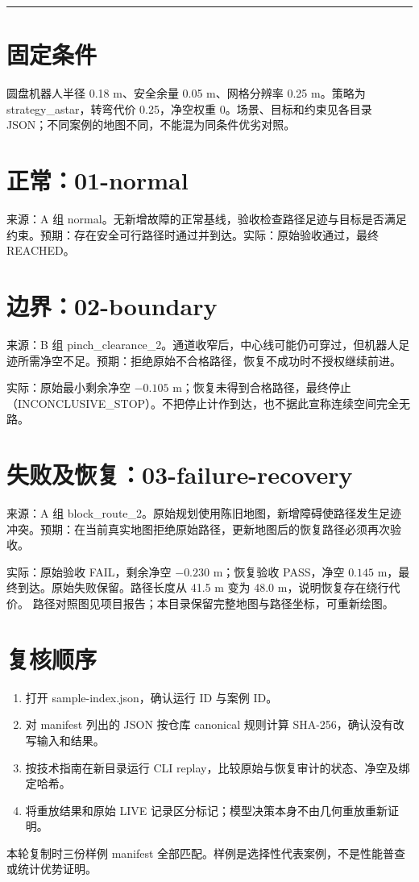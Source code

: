 \documentclass[UTF8,10pt,a4paper]{ctexart}
\newcommand{\cover}[2]{\vspace*{5mm}{\small\textcolor{teal}{WORLDGUARD / SUBMISSION 2026}}\par\vspace{4mm}{\huge\bfseries\color{ink}#1}\par\vspace{3mm}{\large #2}\par\vspace{4mm}\hrule\vspace{5mm}}
\begin{document}
\cover{正常、边界与失败测试样例}{已保存真实执行输入与结果，可离线复核}
\section{固定条件}
圆盘机器人半径 0.18 m、安全余量 0.05 m、网格分辨率 0.25 m。策略为 strategy\_astar，转弯代价 0.25，净空权重 0。场景、目标和约束见各目录 JSON；不同案例的地图不同，不能混为同条件优劣对照。
\section{正常：01-normal}
来源：A 组 normal。无新增故障的正常基线，验收检查路径足迹与目标是否满足约束。预期：存在安全可行路径时通过并到达。实际：原始验收通过，最终 REACHED。
\section{边界：02-boundary}
来源：B 组 pinch\_clearance\_2。通道收窄后，中心线可能仍可穿过，但机器人足迹所需净空不足。预期：拒绝原始不合格路径，恢复不成功时不授权继续前进。

实际：原始最小剩余净空 $-0.105$ m；恢复未得到合格路径，最终停止（INCONCLUSIVE\_STOP）。不把停止计作到达，也不据此宣称连续空间完全无路。
\section{失败及恢复：03-failure-recovery}
来源：A 组 block\_route\_2。原始规划使用陈旧地图，新增障碍使路径发生足迹冲突。预期：在当前真实地图拒绝原始路径，更新地图后的恢复路径必须再次验收。

实际：原始验收 FAIL，剩余净空 $-0.230$ m；恢复验收 PASS，净空 $0.145$ m，最终到达。原始失败保留。路径长度从 41.5 m 变为 48.0 m，说明恢复存在绕行代价。
路径对照图见项目报告；本目录保留完整地图与路径坐标，可重新绘图。
\section{复核顺序}
\begin{enumerate}
\item 打开 sample-index.json，确认运行 ID 与案例 ID。
\item 对 manifest 列出的 JSON 按仓库 canonical 规则计算 SHA-256，确认没有改写输入和结果。
\item 按技术指南在新目录运行 CLI replay，比较原始与恢复审计的状态、净空及绑定哈希。
\item 将重放结果和原始 LIVE 记录区分标记；模型决策本身不由几何重放重新证明。
\end{enumerate}
本轮复制时三份样例 manifest 全部匹配。样例是选择性代表案例，不是性能普查或统计优势证明。
\end{document}
